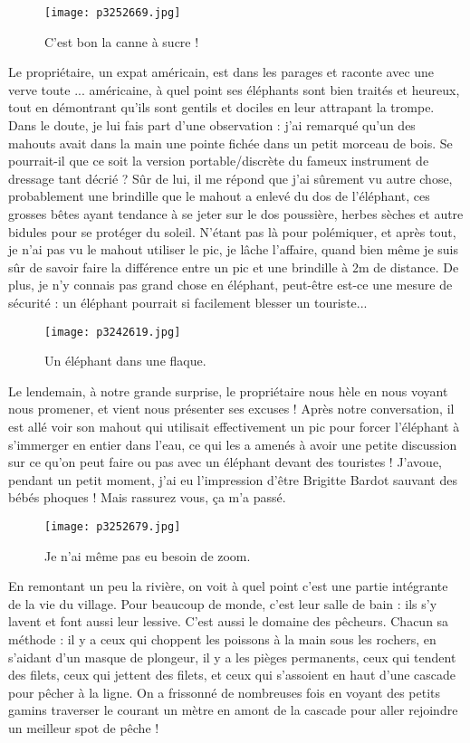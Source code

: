 \documentclass{book}
\begin{document}
\begin{figure}[h]
\centering
\texttt{[image: p3252669.jpg]}
\caption*{C'est bon la canne à sucre !}
\end{figure}

Le propriétaire, un expat américain, est dans les parages et raconte avec une verve toute ... américaine, à quel point ses éléphants sont bien traités et heureux, tout en démontrant qu'ils sont gentils et dociles en leur attrapant la trompe. Dans le doute, je lui fais part d'une observation : j'ai remarqué qu'un des mahouts avait dans la main une pointe fichée dans un petit morceau de bois. Se pourrait-il que ce soit la version portable/discrète du fameux instrument de dressage tant décrié ? Sûr de lui, il me répond que j'ai sûrement vu autre chose, probablement une brindille que le mahout a enlevé du dos de l'éléphant, ces grosses bêtes ayant tendance à se jeter sur le dos poussière, herbes sèches et autre bidules pour se protéger du soleil. N'étant pas là pour polémiquer, et après tout, je n'ai pas vu le mahout utiliser le pic, je lâche l'affaire, quand bien même je suis sûr de savoir faire la différence entre un pic et une brindille à 2m de distance. De plus, je n'y connais pas grand chose en éléphant, peut-être est-ce une mesure de sécurité : un éléphant pourrait si facilement blesser un touriste...


\begin{figure}[h]
\centering
\texttt{[image: p3242619.jpg]}
\caption*{Un éléphant dans une flaque.}
\end{figure}

Le lendemain, à notre grande surprise, le propriétaire nous hèle en nous voyant nous promener, et vient nous présenter ses excuses ! Après notre conversation, il est allé voir son mahout qui utilisait effectivement un pic pour forcer l'éléphant à s'immerger en entier dans l'eau, ce qui les a amenés à avoir une petite discussion sur ce qu'on peut faire ou pas avec un éléphant devant des touristes ! J'avoue, pendant un petit moment, j'ai eu l'impression d'être Brigitte Bardot sauvant des bébés phoques ! Mais rassurez vous, ça m'a passé.


\begin{figure}[h]
\centering
\texttt{[image: p3252679.jpg]}
\caption*{Je n'ai même pas eu besoin de zoom.}
\end{figure}

En remontant un peu la rivière, on voit à quel point c'est une partie intégrante de la vie du village. Pour beaucoup de monde, c'est leur salle de bain : ils s'y lavent et font aussi leur lessive. C'est aussi le domaine des pêcheurs. Chacun sa méthode : il y a ceux qui choppent les poissons à la main sous les rochers, en s'aidant d'un masque de plongeur, il y a les pièges permanents, ceux qui tendent des filets, ceux qui jettent des filets, et ceux qui s'assoient en haut d'une cascade pour pêcher à la ligne. On a frissonné de nombreuses fois en voyant des petits gamins traverser le courant un mètre en amont de la cascade pour aller rejoindre un meilleur spot de pêche !
\end{document}
